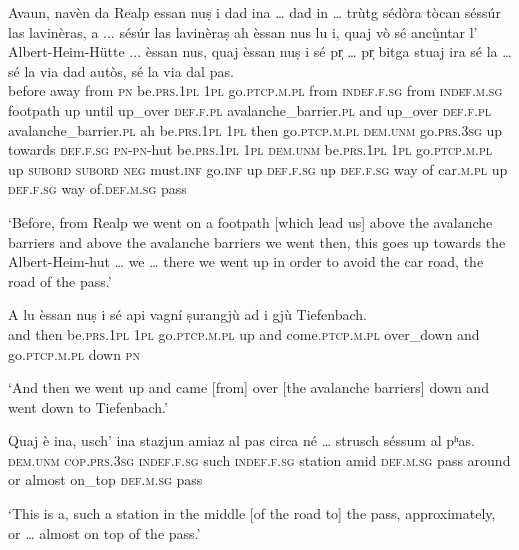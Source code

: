 \begin{linenumbers}
\gll  Avaun, navèn da Realp essan nuṣ i dad ina … dad in … trùtg sédòra tòcan séssúr las lavinèras, a ... sésúr las lavinèraṣ ah èssan nus lu i, quaj vò sé ancù̱ntar l’ Albert-Heim-Hütte\footnotemark{} ... èssan nus, quaj èssan nuṣ i sé pr̩ … pr̩ bitga stuaj ira sé la … sé la via dad autòs, sé la via dal pas. \\
before away from \textsc{pn} be.\textsc{prs.1pl} \textsc{1pl} go.\textsc{ptcp.m.pl} from \textsc{indef.f.sg} {} from \textsc{indef.m.sg} {} footpath up until up\_over \textsc{def.f.pl} avalanche\_barrier.\textsc{pl} and {}  up\_over \textsc{def.f.pl} avalanche\_barrier.\textsc{pl} ah be.\textsc{prs.1pl} \textsc{1pl} then go.\textsc{ptcp.m.pl} \textsc{dem.unm} go.\textsc{prs.3sg} up towards \textsc{def.f.sg} \textsc{pn}-\textsc{pn}-hut {} be.\textsc{prs.1pl} \textsc{1pl} \textsc{dem.unm} be.\textsc{prs.1pl} \textsc{1pl} go.\textsc{ptcp.m.pl} up \textsc{subord} {} \textsc{subord} \textsc{neg} must.\textsc{inf} go.\textsc{inf} up \textsc{def.f.sg} {} up \textsc{def.f.sg} way of car.\textsc{m.pl} up \textsc{def.f.sg} way of.\textsc{def.m.sg} pass  \\
\end{linenumbers}
\medskip
\glt `Before, from Realp we went on a footpath [which lead us] above the avalanche barriers and above the avalanche barriers we went then, this goes up towards the Albert-Heim-hut … we … there we went up in order to avoid the car road, the road of the pass.'
\medskip

\begin{linenumbers}
\gll A lu èssan nuṣ i sé api vagní ṣurangjù ad i gjù Tiefenbach.\\
and then be.\textsc{prs.1pl} \textsc{1pl} go.\textsc{ptcp.m.pl} up and come.\textsc{ptcp.m.pl} over\_down and go.\textsc{ptcp.m.pl} down \textsc{pn} \\
\end{linenumbers} 
\medskip
\glt `And then we went up and came [from] over [the avalanche barriers] down and went down to Tiefenbach.'
\medskip

\begin{linenumbers}
\gll Quaj è ina, usch’ ina stazjun amiaz al pas circa né … strusch séssum al pʰas.   \\
 \textsc{dem.unm} \textsc{cop.prs.3sg} \textsc{indef.f.sg} such \textsc{indef.f.sg} station amid \textsc{def.m.sg} pass around or {} almost on\_top \textsc{def.m.sg} pass\\
\end{linenumbers}
\medskip
\glt `This is a, such a station in the middle [of the road to] the pass, approximately, or … almost on top of the pass.'
\medskip

